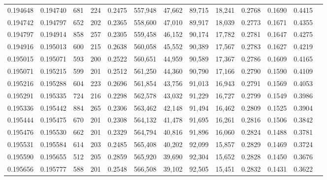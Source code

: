 \begin{tabular}{rrrrrrrrrrrrr}
0.194648 & 0.194740 &   681 & 224 &                                     0.2475 & 557,948 &  47,662 &  89,715 &  18,241 & 0.2768 & 0.1690 & 0.4415 \\
0.194742 & 0.194797 &   652 & 202 &                                     0.2365 & 558,600 &  47,010 &  89,917 &  18,039 & 0.2773 & 0.1671 & 0.4355 \\
0.194797 & 0.194914 &   858 & 257 &                                     0.2305 & 559,458 &  46,152 &  90,174 &  17,782 & 0.2781 & 0.1647 & 0.4275 \\
0.194916 & 0.195013 &   600 & 215 &                                     0.2638 & 560,058 &  45,552 &  90,389 &  17,567 & 0.2783 & 0.1627 & 0.4219 \\
0.195015 & 0.195071 &   593 & 200 &                                     0.2522 & 560,651 &  44,959 &  90,589 &  17,367 & 0.2786 & 0.1609 & 0.4165 \\
0.195071 & 0.195215 &   599 & 201 &                                     0.2512 & 561,250 &  44,360 &  90,790 &  17,166 & 0.2790 & 0.1590 & 0.4109 \\
0.195216 & 0.195288 &   604 & 223 &                                     0.2696 & 561,854 &  43,756 &  91,013 &  16,943 & 0.2791 & 0.1569 & 0.4053 \\
0.195291 & 0.195335 &   724 & 216 &                                     0.2298 & 562,578 &  43,032 &  91,229 &  16,727 & 0.2799 & 0.1549 & 0.3986 \\
0.195336 & 0.195442 &   884 & 265 &                                     0.2306 & 563,462 &  42,148 &  91,494 &  16,462 & 0.2809 & 0.1525 & 0.3904 \\
0.195444 & 0.195475 &   670 & 201 &                                     0.2308 & 564,132 &  41,478 &  91,695 &  16,261 & 0.2816 & 0.1506 & 0.3842 \\
0.195476 & 0.195530 &   662 & 201 &                                     0.2329 & 564,794 &  40,816 &  91,896 &  16,060 & 0.2824 & 0.1488 & 0.3781 \\
0.195531 & 0.195584 &   614 & 203 &                                     0.2485 & 565,408 &  40,202 &  92,099 &  15,857 & 0.2829 & 0.1469 & 0.3724 \\
0.195590 & 0.195655 &   512 & 205 &                                     0.2859 & 565,920 &  39,690 &  92,304 &  15,652 & 0.2828 & 0.1450 & 0.3676 \\
0.195656 & 0.195777 &   588 & 201 &                                     0.2548 & 566,508 &  39,102 &  92,505 &  15,451 & 0.2832 & 0.1431 & 0.3622 \\

\end{tabular}
